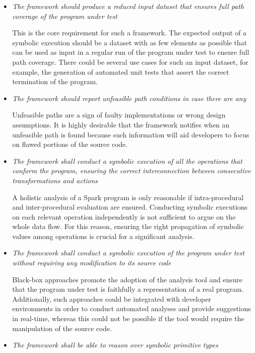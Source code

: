 \newcommand{\reqitem}[1]{\item[\textit{\textbf{R.#1}}]}
\begin{itemize}
\reqitem{1} \textit{The framework should produce a reduced input dataset that ensures full path coverage of the program under test}

This is the core requirement for such a framework. The expected output of a symbolic execution should be a dataset with as few elements as possible that can be used as input in a regular run of the program under test to ensure full path coverage. There could be several use cases for such an input dataset, for example, the generation of automated unit tests that assert the correct termination of the program.

\reqitem{2} \textit{The framework should report unfeasible path conditions in case there are any}

Unfeasible paths are a sign of faulty implementations or wrong design assumptions. It is highly desirable that the framework notifies when an unfeasible path is found because such information will aid developers to focus on flawed portions of the source code.

\reqitem{3} \textit{The framework shall conduct a symbolic execution of all the operations that conform the program, ensuring the correct interconnection between consecutive transformations and actions}

A holistic analysis of a Spark program is only reasonable if intra-procedural and inter-procedural evaluation are ensured. Conducting symbolic executions on each relevant operation independently is not sufficient to argue on the whole data flow. For this reason, ensuring the right propagation of symbolic values among operations is crucial for a significant analysis.
	
\reqitem{4} \textit{The framework shall conduct a symbolic execution of the program under test without requiring any modification to its source code}

Black-box approaches promote the adoption of the analysis tool and ensure that the program under test is faithfully a representation of a real program. Additionally, such approaches could be integrated with developer environments in order to conduct automated analyses and provide suggestions in real-time, whereas this could not be possible if the tool would require the manipulation of the source code. 
	
\reqitem{5} \textit{The framework shall be able to reason over symbolic primitive types}


\end{itemize}
